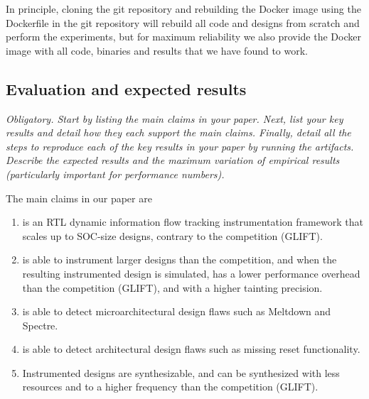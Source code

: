 \documentclass[letterpaper,twocolumn,10pt]{article}
\begin{document}
{In principle, cloning the git repository and rebuilding the Docker image
using the Dockerfile in the git repository will rebuild all \ourname code
and designs from scratch and perform the experiments, but for maximum
reliability we also provide the Docker image with all code, binaries
and results that we have found to work.

\subsection{Evaluation and expected results}

{\em Obligatory. Start by listing the main claims in your paper. Next, list your key results and detail how they each support the main claims. Finally, detail all the steps to reproduce each of the key results in your paper by running the artifacts. Describe the expected results and the maximum variation of empirical results (particularly important for performance numbers).}

The main claims in our paper are
\begin{enumerate}
    \item \ourname is an RTL dynamic information flow tracking instrumentation framework that scales up to SOC-size designs, contrary to the competition (GLIFT).
    \item \ourname is able to instrument larger designs than the competition, and when the resulting instrumented design is simulated, has a lower performance overhead than the competition (GLIFT), and with a higher tainting precision.
    \item \ourname is able to detect microarchitectural design flaws such as Meltdown and Spectre.
    \item \ourname is able to detect architectural design flaws such as missing reset functionality.
    \item Instrumented \ourname designs are synthesizable, and can be synthesized with less resources and to a higher frequency than the competition (GLIFT).
\end{enumerate}

}
\end{document}
